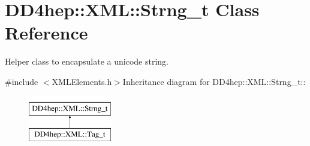 \hypertarget{class_d_d4hep_1_1_x_m_l_1_1_strng__t}{
\section{DD4hep::XML::Strng\_\-t Class Reference}
\label{class_d_d4hep_1_1_x_m_l_1_1_strng__t}
}


Helper class to encapsulate a unicode string.  


{\ttfamily \#include $<$XMLElements.h$>$}Inheritance diagram for DD4hep::XML::Strng\_\-t::\begin{figure}[H]
\begin{center}
\leavevmode
\includegraphics[height=2cm]{class_d_d4hep_1_1_x_m_l_1_1_strng__t}
\end{center}
\end{figure}
